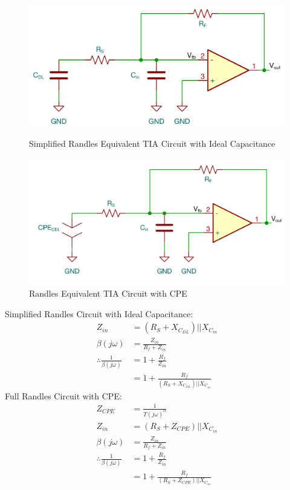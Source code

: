 \begin{figure}[H]
    \centering
    \begin{minipage}{0.5\textwidth}
        \centering
        \includegraphics[width=\textwidth]{RandlesSimpleTIA.png}
        \caption{Simplified Randles Equivalent TIA Circuit with Ideal Capacitance}
        \label{fig:randles_cdl_tia}
    \end{minipage}\hfill
    \begin{minipage}{0.5\textwidth}
        \centering
        \includegraphics[width=\textwidth]{RandlesTIA.png}
        \caption{Randles Equivalent TIA Circuit with CPE}
        \label{fig:randles_cpe_tia}
    \end{minipage}
\end{figure}

Simplified Randles Circuit with Ideal Capacitance:
\begin{align}
    Z_{in} &= (R_S + X_{C_{DL}}) || X_{C_{in}} \label{eq:simple_zin}\\
    \beta (j\omega) &= \frac{Z_{in}}{R_f + Z_{in}} \label{eq:simple_beta} \\
    \therefore \frac{1}{\beta(j\omega)} &= 1 + \frac{R_f}{Z_{in}} \nonumber\\
    &= 1 + \frac{R_f}{(R_S + X_{C_{DL}}) || X_{C_{in}}}
\end{align}
Full Randles Circuit with CPE:
\begin{align}
    Z_{CPE} &= \frac{1}{T(j\omega)^{\alpha}} \\
    Z_{in} &= (R_S + Z_{CPE}) || X_{C_{in}} \\
    \beta (j\omega) &= \frac{Z_{in}}{R_f + Z_{in}} \label{eq:randles_beta}\\
    \therefore \frac{1}{\beta(j\omega)} &= 1 + \frac{R_f}{Z_{in}} \nonumber\\
    &= 1 + \frac{R_f}{(R_S + Z_{CPE}) || X_{C_{in}}}
\end{align}

